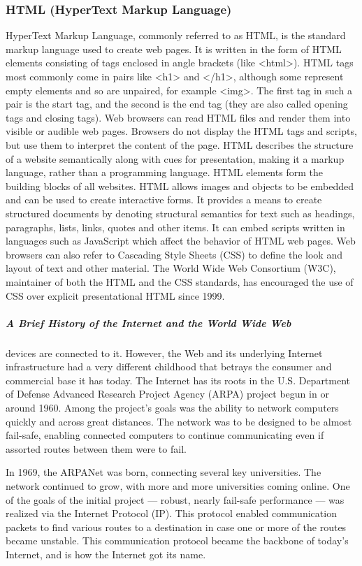 \subsubsection{HTML (HyperText Markup Language)}
HyperText Markup Language, commonly referred to as HTML, is the standard markup language used to create web pages. It is written in the form of HTML elements consisting of tags enclosed in angle brackets (like <html>). HTML tags most commonly come in pairs like <h1> and </h1>, although some represent empty elements and so are unpaired, for example <img>. The first tag in such a pair is the start tag, and the second is the end tag (they are also called opening tags and closing tags).
Web browsers can read HTML files and render them into visible or audible web pages. Browsers do not display the HTML tags and scripts, but use them to interpret the content of the page. HTML describes the structure of a website semantically along with cues for presentation, making it a markup language, rather than a programming language.
HTML elements form the building blocks of all websites. HTML allows images and objects to be embedded and can be used to create interactive forms. It provides a means to create structured documents by denoting structural semantics for text such as headings, paragraphs, lists, links, quotes and other items. It can embed scripts written in languages such as JavaScript which affect the behavior of HTML web pages.
Web browsers can also refer to Cascading Style Sheets (CSS) to define the look and layout of text and other material. The World Wide Web Consortium (W3C), maintainer of both the HTML and the CSS standards, has encouraged the use of CSS over explicit presentational HTML since 1999.
\subparagraph*{A Brief History of the Internet and the World Wide Web}
\hfill \break
devices are connected to it. However, the Web and its underlying Internet infrastructure had a
very different childhood that betrays the consumer and commercial base it has today.
The Internet has its roots in the U.S. Department of Defense Advanced Research Project Agency
(ARPA) project begun in or around 1960. Among the project’s goals was the ability to network
computers quickly and across great distances. The network was to be designed to be almost
fail-safe, enabling connected computers to continue communicating even if assorted routes
between them were to fail.

In 1969, the ARPANet was born, connecting several key universities. The network continued
to grow, with more and more universities coming online. One of the goals of the initial
project — robust, nearly fail-safe performance — was realized via the Internet Protocol (IP).
This protocol enabled communication packets to find various routes to a destination in case one
or more of the routes became unstable. This communication protocol became the backbone of
today’s Internet, and is how the Internet got its name.


